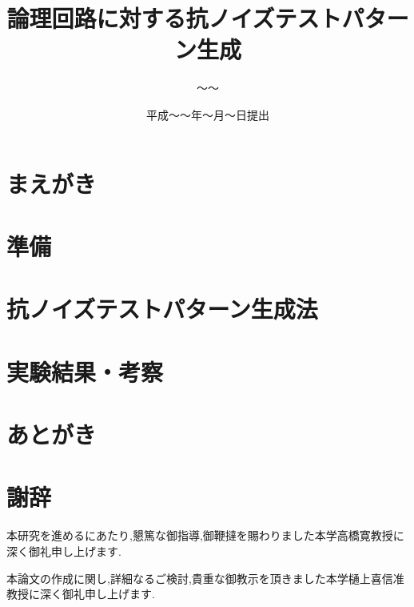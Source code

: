 

\newenvironment{indention}[1]{\par
\addtolength{\leftskip}{#1}
\begingroup}{\endgroup\par}

\title{論理回路に対する抗ノイズテストパターン生成}
\author{～～}
\date{平成～～年～月～日提出}


\maketitle
\tableofcontents
\cleardoublepage
{}

\chapter{まえがき}


\chapter{準備}


\chapter{抗ノイズテストパターン生成法}


\chapter{実験結果・考察}


\chapter{あとがき}



\newpage
{}
\chapter*{謝辞}
本研究を進めるにあたり,懇篤な御指導,御鞭撻を賜わりました本学高橋寛教授に深く御礼申し上げます.

本論文の作成に関し,詳細なるご検討,貴重な御教示を頂きました本学樋上喜信准教授に深く御礼申し上げます.

